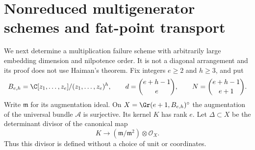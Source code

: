 \section{Nonreduced multigenerator schemes and fat-point transport}
\label{sec:nonreduced-multigenerator}
We next determine a multiplication failure scheme with arbitrarily
large embedding dimension and nilpotence order. It is not a diagonal
arrangement and its proof does not use Haiman's theorem.
Fix integers $e\ge2$ and $h\ge3$, and put
\begin{equation}\label{eq:fat-algebra}
 B_{e,h}=\C[z_1,\ldots,z_e]/(z_1,\ldots,z_e)^h,
 \qquad d=\binom{e+h-1}{e},\qquad N=\binom{e+h-1}{e+1}.
\end{equation}
Write $\mathfrak m$ for its augmentation ideal.
On $X=\Gr(e+1,B_{e,h})^\circ$ the augmentation of the universal
bundle $\mathcal A$ is surjective. Its kernel $K$ has rank $e$.
Let $\Delta\subset X$ be the determinant divisor of the canonical map
\begin{equation}\label{eq:fat-tangent-map}
 K\longrightarrow(\mathfrak m/\mathfrak m^2)\otimes\mathcal O_X.
\end{equation}
Thus this divisor is defined without a choice of unit or coordinates.

